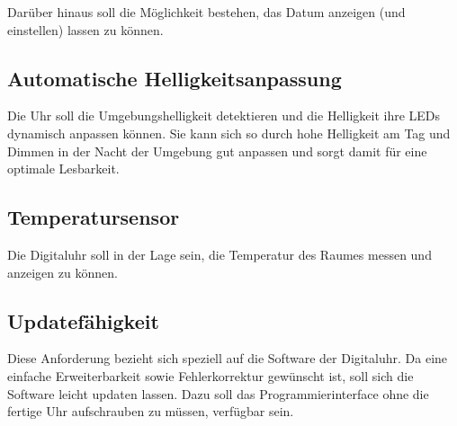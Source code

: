 Darüber hinaus soll die Möglichkeit bestehen, das Datum anzeigen (und einstellen) lassen zu können.
%
\subsection{Automatische Helligkeitsanpassung}
Die Uhr soll die Umgebungshelligkeit detektieren und die Helligkeit ihre LEDs dynamisch anpassen können. Sie kann sich so
durch hohe Helligkeit am Tag und Dimmen in der Nacht der Umgebung gut anpassen und sorgt damit für eine optimale Lesbarkeit.
%
\subsection{Temperatursensor}
Die Digitaluhr soll in der Lage sein, die Temperatur des Raumes messen und anzeigen zu können.
%
\subsection{Updatefähigkeit}
Diese Anforderung bezieht sich speziell auf die Software der Digitaluhr. Da eine einfache Erweiterbarkeit sowie Fehlerkorrektur
gewünscht ist, soll sich die Software leicht updaten lassen. Dazu soll das Programmierinterface ohne die fertige Uhr
aufschrauben zu müssen, verfügbar sein.
%